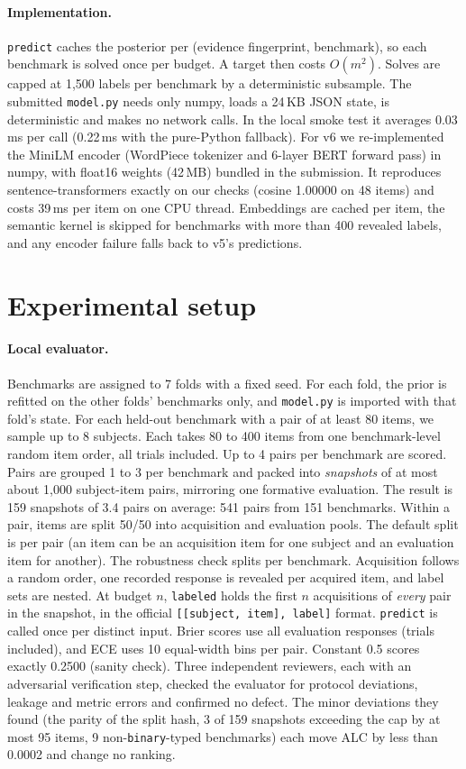 \documentclass{article}
\begin{document}
\paragraph{Implementation.} \texttt{predict} caches the posterior per (evidence fingerprint,
benchmark), so each benchmark is solved once per budget. A target then costs $O(m^2)$. Solves are
capped at 1,500 labels per benchmark by a deterministic subsample. The submitted \texttt{model.py}
needs only numpy, loads a 24\,KB JSON state, is deterministic and makes no network calls. In the
local smoke test it averages 0.03\,ms per call (0.22\,ms with the pure-Python fallback).
For v6 we re-implemented the MiniLM encoder (WordPiece tokenizer and 6-layer BERT forward pass) in
numpy, with float16 weights (42\,MB) bundled in the submission. It reproduces sentence-transformers
exactly on our checks (cosine 1.00000 on 48 items) and costs 39\,ms per item on one CPU thread.
Embeddings are cached per item, the semantic kernel is skipped for benchmarks with more than 400
revealed labels, and any encoder failure falls back to v5's predictions.

\section{Experimental setup}
\label{sec:setup}

\paragraph{Local evaluator.} Benchmarks are assigned to 7 folds with a fixed seed. For each fold,
the prior is refitted on the other folds' benchmarks only, and \texttt{model.py} is imported with
that fold's state. For each held-out benchmark with a pair of at least 80 items, we sample up to 8
subjects. Each takes 80 to 400 items from one benchmark-level random item order, all trials
included. Up to 4 pairs per benchmark are scored. Pairs are grouped 1 to 3 per benchmark and packed
into \emph{snapshots} of at most about 1,000 subject-item pairs, mirroring one formative evaluation.
The result is 159 snapshots of 3.4 pairs on average: 541 pairs from 151 benchmarks.
Within a pair, items are split 50/50 into acquisition and evaluation pools. The default split is
per pair (an item can be an acquisition item for one subject and an evaluation item for another).
The robustness check splits per benchmark. Acquisition follows a random order, one recorded
response is revealed per acquired item, and label sets are nested. At budget $n$,
\texttt{labeled} holds the first $n$ acquisitions of \emph{every} pair in the snapshot, in the
official \texttt{[[subject, item], label]} format. \texttt{predict} is called once per distinct
input. Brier scores use all evaluation responses (trials included), and ECE uses 10 equal-width bins
per pair. Constant 0.5 scores exactly 0.2500 (sanity check). Three independent reviewers, each with
an adversarial verification step, checked the evaluator for protocol deviations, leakage and metric
errors and confirmed no defect. The minor deviations they found (the parity of the split hash, 3 of
159 snapshots exceeding the cap by at most 95 items, 9 non-\texttt{binary}-typed benchmarks) each move
ALC by less than 0.0002 and change no ranking.
\end{document}
